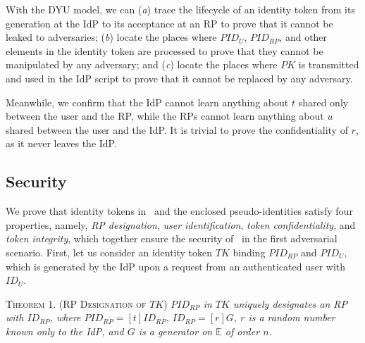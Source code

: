With the DYU model, we can (\emph{a}) trace the lifecycle of an identity token from its generation at the IdP to its acceptance at an RP to prove that it cannot be leaked to adversaries; (\emph{b}) locate the places where $PID_U$, $PID_{RP}$, and other elements in the identity token are processed to prove that they cannot be manipulated by any adversary; and (\emph{c}) locate the places where $PK$ is transmitted and used in the IdP script to prove that it cannot be replaced by any adversary.

Meanwhile, we confirm that the IdP cannot learn anything about $t$ shared only between the user and the RP, while the RPs cannot learn anything about $u$ shared between the user and the IdP. It is trivial to prove the confidentiality of $r$, as it never leaves the IdP.

\subsection{Security}
\label{analysis-security}


We prove that identity tokens in \usso~and the enclosed pseudo-identities satisfy four properties, namely, \emph{RP designation}, \emph{user identification}, \emph{token confidentiality}, and \emph{token integrity}, which together ensure the security of \usso~in the first adversarial scenario.
First, let us consider an identity token $TK$ binding $PID_{RP}$ and $PID_U$, which is generated by the IdP upon a request from an authenticated user with $ID_U$.


\vspace{3mm}
\noindent\textsc{Theorem 1. (RP Designation of $TK$)} {\em $PID_{RP}$ in $TK$ uniquely designates an RP with $ID_{RP}$, where $PID_{RP}= [t]ID_{RP}$, $ID_{RP} = [r]G$, $r$ is a random number known only to the IdP, and $G$ is a generator on $\mathbb{E}$ of order $n$.}

